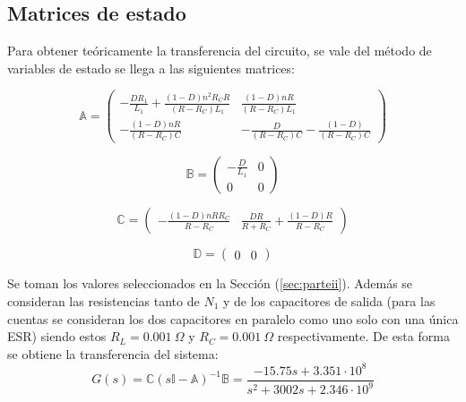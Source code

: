 %
%
%

\subsection{Matrices de estado}

Para obtener teóricamente la transferencia del circuito, se vale del método de variables de estado se llega a las siguientes matrices:

\begin{multicols}{2}
\begin{equation}
\mathbb{A} = 
\begin{pmatrix}
-\frac{DR_1}{L_1} + \frac{(1 - D) n^2 R_C R}{(R - R_C) L_1} & \frac{(1-D) n R}{(R - R_C) L_1}\\
-\frac{(1 - D) n R}{(R - R_C) C} & -\frac{D }{(R - R_C) C} - \frac{(1 - D)}{(R - R_C) C}
\end{pmatrix}
\end{equation}

\begin{equation}
\mathbb{B} = 
\begin{pmatrix}
	-\frac{D}{L_1} & 0\\
	0 & 0
\end{pmatrix}
\end{equation}

\begin{equation}
\mathbb{C} = 
\begin{pmatrix}
	-\frac{(1-D)n R R_C}{R - R_C} & \frac{D R}{R + R_C} + \frac{(1-D) R}{R - R_C}
\end{pmatrix}
\end{equation}

\begin{equation}
\mathbb{D} = 
\begin{pmatrix}
	0 & 0
\end{pmatrix}
\end{equation}
\end{multicols}

Se toman los valores seleccionados en la Sección (\ref{sec:parteii}). Además se consideran las resistencias tanto de $N_1$ y de los capacitores de salida (para las cuentas se consideran los dos capacitores en paralelo como uno solo con una única ESR) siendo estos $R_L = 0.001 \ \Omega$ y $R_C = 0.001 \ \Omega$ respectivamente. De esta forma se obtiene la transferencia del sistema:
\begin{equation}
	G(s) = \mathbb{C} \left(s \mathbb{I} - \mathbb{A} \right)^{-1} \mathbb{B} = \frac{-15.75 s + 3.351 \cdot 10^{8}}{s^2 + 3002s + 2.346 \cdot 10^{9}}
\end{equation}

